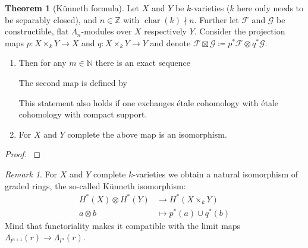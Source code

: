 \documentclass[english,headsepline=0.25pt]{scrartcl}
\theoremstyle{definition}
\newtheorem{Thm}[Def]{Theorem}
\theoremstyle{remark}
\newtheorem{Rem}[Def]{Remark}
\newcommand*{\N}{\mathds{N}}
\newcommand*{\Z}{\mathds{Z}}
\newcommand*{\Zmod}[1]{\Z/#1} %
\newcommand*{\F}{\mathcal{F}} %
\newcommand*{\G}{\mathcal{G}} %
\DeclareMathOperator{\Char}{char} %
\DeclareMathOperator{\Tor}{Tor} %
\begin{document}
\begin{Thm}[Künneth formula]\label{kuennethiso}
  Let $X$ and $Y$ be $k$-varieties
  ($k$ here only needs to be separably closed), and
  $n\in\Z$ with $\Char(k)\nmid n$.
  Further let $\F$ and $\G$ be constructible, flat $\Lambda_n$-modules
  over $X$ respectively $Y$.
  Consider the projection maps
  $p\colon X\times_k Y\to X$ and
  $q\colon X\times_k Y\to Y$ and denote
  $\F\boxtimes\G\coloneqq p^*\F\otimes q^*\G$. 
  \begin{enumerate}
  \item   Then for any $m\in\N$ there is an exact sequence
    \begin{center}
    \end{center}
    The second map is defined by
    \begin{center}
    \end{center}
    This statement also holds if one exchanges étale cohomology with
    étale cohomology with compact support.
  \item For $X$ and $Y$ complete the above map is an isomorphism. 
  \end{enumerate}
  \begin{proof}\cite[][Thm.~V.8.5 and Cor.~V.8.13]{milnebook}\end{proof}
\end{Thm}

\begin{Rem}
  For $X$ and $Y$ complete $k$-varieties we obtain a natural
  isomorphism of graded rings, the so-called Künneth isomorphism:
  \begin{align*}
    H^*(X)\otimes H^*(Y) &\rightarrow H^*(X\times_k Y)\\
    a\otimes b &\mapsto p^*(a) \cup q^*(b)
  \end{align*}
  Mind that functoriality makes it compatible with the limit maps
  $\Lambda_{l^{n+1}}(r)\to\Lambda_{l^n}(r)$.
\end{Rem}
\end{document}
